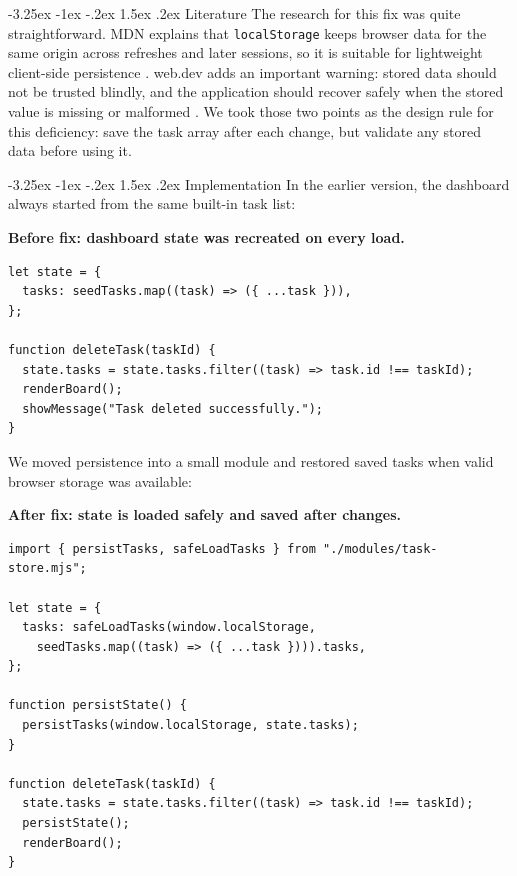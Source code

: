 ﻿\documentclass[12pt,a4paper]{article}
\makeatletter
\renewcommand\subsection{\@startsection{subsection}{2}{\z@}%
  {-3.25ex \@plus -1ex \@minus -.2ex}%
  {1.5ex \@plus .2ex}%
  {\normalfont\bfseries\fontsize{12}{14}\selectfont}}
\makeatother
\begin{document}
\subsection{Literature}
The research for this fix was quite straightforward. MDN explains that
\texttt{localStorage} keeps browser data for the same origin across refreshes
and later sessions, so it is suitable for lightweight client-side persistence
\cite{mdn-localstorage}. web.dev adds an important warning: stored data should
not be trusted blindly, and the application should recover safely when the
stored value is missing or malformed \cite{webdev-storage}. We took those two
points as the design rule for this deficiency: save the task array after each
change, but validate any stored data before using it.

\subsection{Implementation}
In the earlier version, the dashboard always started from the same built-in task
list:

\noindent\textbf{Before fix: dashboard state was recreated on every load.}
{\footnotesize
\begin{verbatim}
let state = {
  tasks: seedTasks.map((task) => ({ ...task })),
};

function deleteTask(taskId) {
  state.tasks = state.tasks.filter((task) => task.id !== taskId);
  renderBoard();
  showMessage("Task deleted successfully.");
}
\end{verbatim}
}

We moved persistence into a small module and restored saved tasks when valid
browser storage was available:

\noindent\textbf{After fix: state is loaded safely and saved after changes.}
{\footnotesize
\begin{verbatim}
import { persistTasks, safeLoadTasks } from "./modules/task-store.mjs";

let state = {
  tasks: safeLoadTasks(window.localStorage,
    seedTasks.map((task) => ({ ...task }))).tasks,
};

function persistState() {
  persistTasks(window.localStorage, state.tasks);
}

function deleteTask(taskId) {
  state.tasks = state.tasks.filter((task) => task.id !== taskId);
  persistState();
  renderBoard();
}
\end{verbatim}
}
\end{document}
